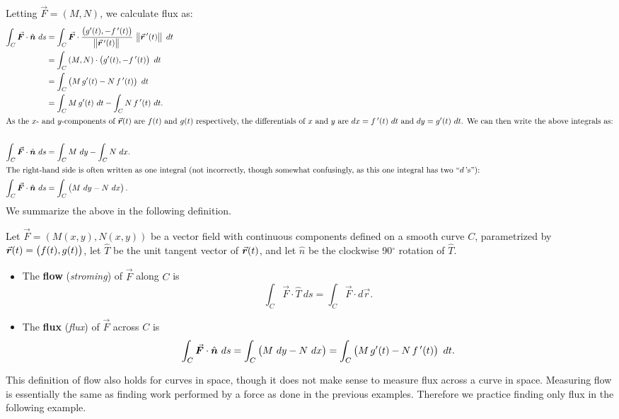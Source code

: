Letting $\vec F = \left( M, N\right)$, we calculate flux as:
\allowdisplaybreaks
\begin{align*}
\int_C \vec F\cdot \hat n\ ds &= \int_C \vec F\cdot \frac{\left( g'(t),-\fp(t)\right)}{\norm{\vrp(t)}} \ \norm{\vrp(t)}\ dt \\
				&= \int_C \left( M, N\right) \cdot \left( g'(t),-\fp(t)\right)\ dt \\
				&= \int_C \left(M\,g'(t) - N\,\fp(t)\right)\ dt\\
				&= \int_C M\,g'(t)\ dt - \int_C N\,\fp(t)\ dt.\\
				\intertext{As the $x$- and $y$-components of $\vrt$ are $f(t)$ and $g(t)$ respectively, the differentials of $x$ and $y$ are $dx = \fp(t)\ dt$ and $dy=g'(t)\ dt$. We can then write the above integrals as:}\\
			\int_C \vec F\cdot \hat n\ ds 	&= \int_C M\ dy - \int_C N\ dx.\\
				\intertext{The right-hand side is often written as one integral (not incorrectly, though somewhat confusingly, as this one integral has two ``$d$\,'s''):}
			\int_C \vec F\cdot \hat n\ ds 	&=\int_C \big( M\ dy -N\ dx \big)\,.
\end{align*}
We summarize the above in the following definition.

\begin{definition}
\label{def:flowflux}
Let $\vec F=\left( M(x,y),N(x,y)\right)$ be a vector field with continuous components defined on a smooth curve $C$, parametrized by $\vrt =\left( f(t),g(t)\right)$, let $\widehat T$ be the unit tangent vector of $\vrt$, and let $\hat n$ be the clockwise 90$^\circ$ rotation of $\widehat T$.
\begin{itemize}
	\item The \textbf{flow} (\textit{stroming}) of $\vec F$ along $C$ is
$$\int_C \vec F\cdot\widehat T\ ds=\int_C \vec F\cdot d\vec r.$$
	\item The \textbf{flux} (\textit{flux}) of $\vec F$ across $C$ is
$$\int_C \vec F\cdot \hat n\ ds =  \int_C \big( M\ dy -N\ dx \big)= \int_C\left(M\,g'(t) - N\,\fp(t)\right)\ dt. $$
\end{itemize}
\end{definition}

This definition of flow also holds for curves in space, though it does not make sense to measure flux across a curve in space. Measuring flow is essentially the same as finding work performed by a force as done in the previous examples. Therefore we practice finding only flux in the following example.

